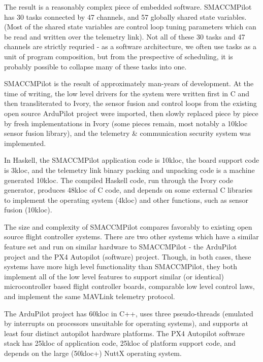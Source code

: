 The result is a reasonably complex piece of embedded software.  SMACCMPilot has
30 tasks connected by 47 channels, and 57 globally shared state variables. (Most
of the shared state variables are control loop tuning parameters which can be
read and written over the telemetry link). Not all of these 30 tasks and 47
channels are strictly requried - as a software architecture, we often use tasks
as a unit of program composition, but from the prespective of scheduling, it is
probably possible to collapse many of these tasks into one.

SMACCMPilot is the result of approximately  man-years of development. At the
time of writing, the low level drivers for the system were written first in C
and then transliterated to Ivory, the sensor fusion and control loops from the
existing open source ArduPilot project were imported, then slowly replaced piece
by piece by fresh implementations in Ivory (some pieces remain, most notably a
10kloc sensor fusion library), and the telemetry \& communication security
system was implemented.

In Haskell, the SMACCMPilot application code is 10kloc, the board support code
is 3kloc, and the telemetry link binary packing and unpacking code is a machine
generated 10kloc. The compiled Haskell code, run through the Ivory code
generator, produces 48kloc of C code, and depends on some external C libraries
to implement the operating system (4kloc) and other functions, such as sensor
fusion (10kloc).

The size and complexity of SMACCMPilot compares favorably to existing open
source flight controller systems. There are two other systems which have a
similar feature set and run on similar hardware to SMACCMPilot - the ArduPilot
project and the PX4 Autopilot (software) project. Though, in both cases, these
systems have more high level functionality than SMACCMPilot, they both implement
all of the low level features to support similar (or identical) microcontroller
based flight controller boards, comparable low level control laws, and implement
the same MAVLink telemetry protocol.

The ArduPilot project has 60kloc in C++, uses three pseudo-threads (emulated by
interrupts on processors unsuitable for operating systems), and supports at
least four distinct autopilot hardware platforms. The PX4 Autopilot software
stack has 25kloc of application code, 25kloc of platform support code, and
depends on the large (50kloc+) NuttX operating system.

